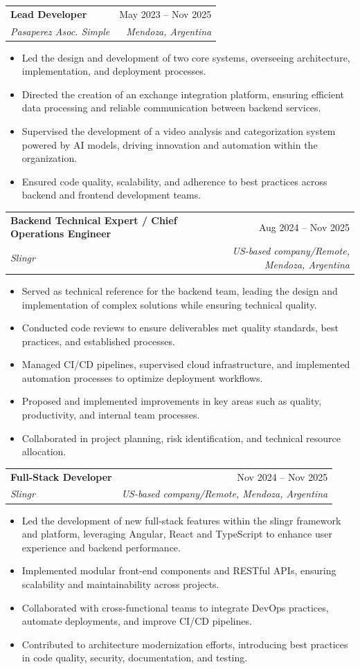 \documentclass[letterpaper,11pt]{article}
\makeatletter
\newcommand{\resumeItem}[1]{
  \item\small{
    {#1 \vspace{-1pt}}
  }
}
\newcommand{\resumeSubheading}[4]{
  \needspace{4\baselineskip}\vspace{-1pt}\item
    \begin{tabular*}{0.97\textwidth}[t]{l@{\extracolsep{\fill}}r}
      \textbf{#1} & #2 \\
      \textit{\small#3} & \textit{\small #4} \\
    \end{tabular*}\vspace{-5pt}
}
\newcommand{\resumeItemListStart}{\begin{itemize}}
\newcommand{\resumeItemListEnd}{\end{itemize}\vspace{-3pt}}
\makeatother
\begin{document}
\resumeSubheading
  {Lead Developer}{May 2023 -- Nov 2025}
  {Pasaperez Asoc. Simple}{Mendoza, Argentina}
  \resumeItemListStart
    \resumeItem{Led the design and development of two core systems, overseeing architecture, implementation, and deployment processes.}
    \resumeItem{Directed the creation of an exchange integration platform, ensuring efficient data processing and reliable communication between backend services.}
    \resumeItem{Supervised the development of a video analysis and categorization system powered by AI models, driving innovation and automation within the organization.}
    \resumeItem{Ensured code quality, scalability, and adherence to best practices across backend and frontend development teams.}
  \resumeItemListEnd

  \resumeSubheading
  {Backend Technical Expert / Chief Operations Engineer}{Aug 2024 -- Nov 2025}
  {Slingr}{US-based company/Remote, Mendoza, Argentina}
  \resumeItemListStart
    \resumeItem{Served as technical reference for the backend team, leading the design and implementation of complex solutions while ensuring technical quality.}
    \resumeItem{Conducted code reviews to ensure deliverables met quality standards, best practices, and established processes.}
    \resumeItem{Managed CI/CD pipelines, supervised cloud infrastructure, and implemented automation processes to optimize deployment workflows.}
    \resumeItem{Proposed and implemented improvements in key areas such as quality, productivity, and internal team processes.}
    \resumeItem{Collaborated in project planning, risk identification, and technical resource allocation.}
  \resumeItemListEnd

  \resumeSubheading
  {Full-Stack Developer}{Nov 2024 -- Nov 2025}
  {Slingr}{US-based company/Remote, Mendoza, Argentina}
  \resumeItemListStart
    \resumeItem{Led the development of new full-stack features within the slingr framework and platform, leveraging Angular, React and TypeScript to enhance user experience and backend performance.}
    \resumeItem{Implemented modular front-end components and RESTful APIs, ensuring scalability and maintainability across projects.}
    \resumeItem{Collaborated with cross-functional teams to integrate DevOps practices, automate deployments, and improve CI/CD pipelines.}
    \resumeItem{Contributed to architecture modernization efforts, introducing best practices in code quality, security, documentation, and testing.}
  \resumeItemListEnd
\end{document}
